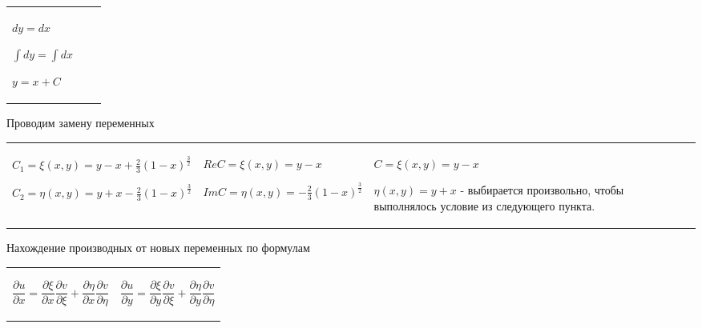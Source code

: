 \documentclass[a4paper, 12pt]{extarticle}
\newcommand{\D}[2]{\frac{\partial #1}{\partial #2}}
\begin{document}
\begin{enumerate}[leftmargin=*]
\begin{tabularx}{\textwidth} { 
         >{\centering}X 
         >{\centering}X 
         >{\centering}X  }
\begin{tcolorbox}
                $dy=dx$

                $\int dy=\int dx$

                $y=x+C$
            \end{tcolorbox}

    \end{tabularx}

    Проводим замену переменных

    \begin{tabularx}{\textwidth} { 
        >{\centering}X 
        >{\centering}X 
        >{\centering}X  }
        \begin{tcolorbox}[height=3cm]
            $C_1=\xi(x,y)=y-x+\frac{2}{3}(1-x)^{\frac{3}{2}}$

            $C_2=\eta(x,y)=y+x-\frac{2}{3}(1-x)^{\frac{3}{2}}$
        \end{tcolorbox}&
        \begin{tcolorbox}[height=3cm]
            $ReC=\xi(x,y)=y-x$

            $ImC=\eta(x,y)=-\frac{2}{3}(1-x)^{\frac{3}{2}}$
        \end{tcolorbox}&
        \begin{tcolorbox}[height=3cm]
            $C=\xi(x,y)=y-x$

            $\eta(x,y)=y+x$ - выбирается произвольно,
            чтобы выполнялось условие 
            из следующего пункта.
        \end{tcolorbox}

    \end{tabularx}
    Нахождение производных от новых переменных по формулам

    \begin{tabular}{ll}
        \begin{tcolorbox}[width=4.5cm,height=1.5cm, top=-0.3cm]
            $$\D{u}{x}=\D{\xi}{x}\D{v}{\xi}+\D{\eta}{x}\D{v}{\eta}$$
        \end{tcolorbox}&
        \begin{tcolorbox}[width=4.5cm,height=1.5cm, top=-0.3cm]
            $$\D{u}{y}=\D{\xi}{y}\D{v}{\xi}+\D{\eta}{y}\D{v}{\eta}$$
        \end{tcolorbox}
    \end{tabular}
    

\end{enumerate}
\end{document}
